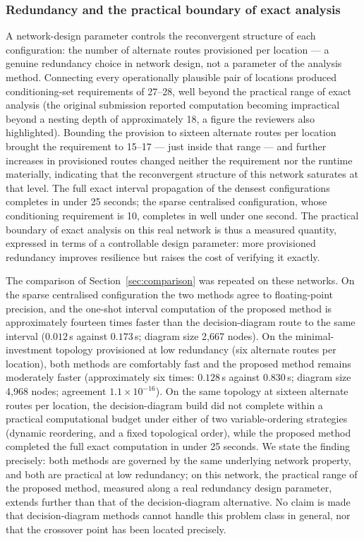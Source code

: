 \documentclass[preprint,12pt]{elsarticle}
\theoremstyle{definition}
\begin{document}
\subsubsection{Redundancy and the practical boundary of exact analysis}\label{sec:redundancy}

A network-design parameter controls the reconvergent structure of each configuration: the number of
alternate routes provisioned per location --- a genuine redundancy choice in network design, not a
parameter of the analysis method. Connecting every operationally plausible pair of locations produced
conditioning-set requirements of 27--28, well beyond the practical range of exact analysis (the original
submission reported computation becoming impractical beyond a nesting depth of approximately 18, a
figure the reviewers also highlighted). Bounding the provision to sixteen alternate routes per location
brought the requirement to 15--17 --- just inside that range --- and further increases in provisioned
routes changed neither the requirement nor the runtime materially, indicating that the reconvergent
structure of this network saturates at that level. The full exact interval propagation of the densest
configurations completes in under 25 seconds; the sparse centralised configuration, whose conditioning
requirement is 10, completes in well under one second. The practical boundary of exact analysis on this
real network is thus a measured quantity, expressed in terms of a controllable design parameter: more
provisioned redundancy improves resilience but raises the cost of verifying it exactly.

The comparison of Section~\ref{sec:comparison} was repeated on these networks. On the sparse centralised
configuration the two methods agree to floating-point precision, and the one-shot interval computation
of the proposed method is approximately fourteen times faster than the decision-diagram route to the
same interval ($0.012$\,s against $0.173$\,s; diagram size 2{,}667 nodes). On the minimal-investment
topology provisioned at low redundancy (six alternate routes per location), both methods are comfortably
fast and the proposed method remains moderately faster (approximately six times: $0.128$\,s against
$0.830$\,s; diagram size 4{,}968 nodes; agreement $1.1\times10^{-16}$). On the same topology at sixteen
alternate routes per location, the decision-diagram build did not complete within a practical
computational budget under either of two variable-ordering strategies (dynamic reordering, and a fixed
topological order), while the proposed method completed the full exact computation in under 25 seconds.
We state the finding precisely: both methods are governed by the same underlying network property, and
both are practical at low redundancy; on this network, the practical range of the proposed method,
measured along a real redundancy design parameter, extends further than that of the decision-diagram
alternative. No claim is made that decision-diagram methods cannot handle this problem class in general,
nor that the crossover point has been located precisely.
\end{document}
